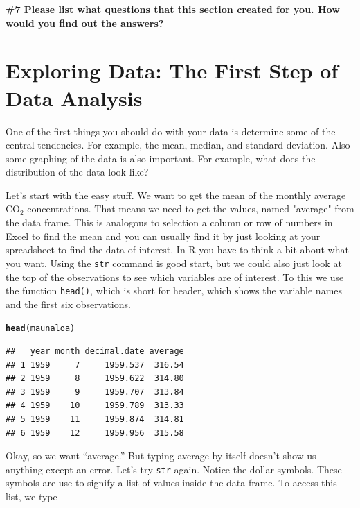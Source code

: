 \documentclass{tufte-handout}\usepackage[]{graphicx}\usepackage[]{color}
\makeatletter
\newcommand{\hlstd}[1]{\textcolor[rgb]{0.345,0.345,0.345}{#1}}%
\newcommand{\hlkwd}[1]{\textcolor[rgb]{0.737,0.353,0.396}{\textbf{#1}}}%
\newenvironment{kframe}{%
 \def\at@end@of@kframe{}%
 \ifinner\ifhmode%
  \def\at@end@of@kframe{\end{minipage}}%
  \begin{minipage}{\columnwidth}%
 \fi\fi%
 \def\FrameCommand##1{\hskip\@totalleftmargin \hskip-\fboxsep
 \colorbox{shadecolor}{##1}\hskip-\fboxsep
     \hskip-\linewidth \hskip-\@totalleftmargin \hskip\columnwidth}%
 \MakeFramed {\advance\hsize-\width
   \@totalleftmargin\z@ \linewidth\hsize
   \@setminipage}}%
 {\par\unskip\endMakeFramed%
 \at@end@of@kframe}
\newenvironment{knitrout}{}{} %
\makeatother
\begin{document}
\bigskip
\noindent \textbf{\#7 Please list what questions that this section created for you. How would you find out the answers? }
 
\section{Exploring Data: The First Step of Data Analysis}

One of the first things you should do with your data is determine some of the central tendencies. For example, the mean, median, and standard deviation. Also some graphing of the data is also important. For example, what does the distribution of the data look like? 

Let's start with the easy stuff. We want to get the mean of the monthly average CO$_2$ concentrations. That means we need to get the values, named "average" from the data frame. This is analogous to selection a column or row of numbers in Excel to find the mean and you can usually find it by just looking at your spreadsheet to find the data of interest. In R you have to think a bit about what you want. Using the \texttt{str} command is good start, but we could also just look at the top of the observations to see which variables are of interest. To this we use the function \texttt{head()}, which is short for header, which shows the variable names and the first six observations.

\begin{knitrout}
\color{fgcolor}\begin{kframe}
\begin{alltt}
\hlkwd{head}\hlstd{(maunaloa)}
\end{alltt}
\begin{verbatim}
##   year month decimal.date average
## 1 1959     7     1959.537  316.54
## 2 1959     8     1959.622  314.80
## 3 1959     9     1959.707  313.84
## 4 1959    10     1959.789  313.33
## 5 1959    11     1959.874  314.81
## 6 1959    12     1959.956  315.58
\end{verbatim}
\end{kframe}
\end{knitrout}

Okay, so we want ``average.'' But typing average by itself doesn't show us anything except an error. Let's try \texttt{str} again. Notice the dollar symbols.  These symbols are use to signify a list of values inside the data frame. To access this list, we type
\end{document}
